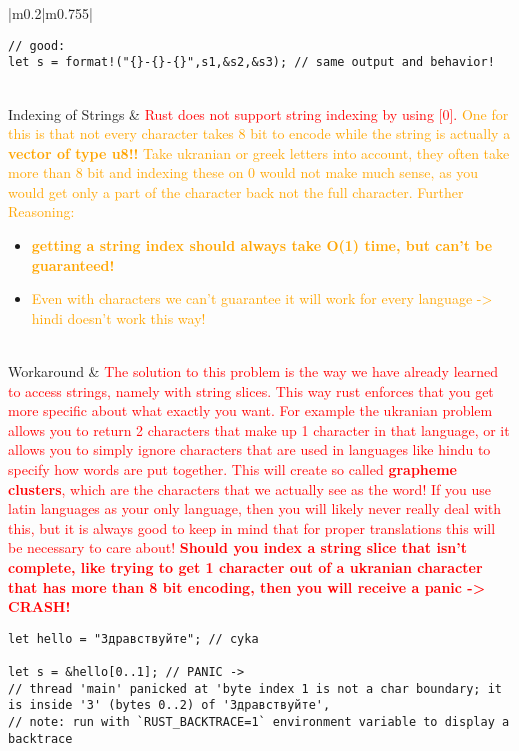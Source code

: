 \documentclass[main.tex,fontsize=8pt,paper=a4,paper=portrait,DIV=calc,]{scrartcl}
\begin{document}
\begin{table}[ht!]
\begin{tabular}{|m{0.2\linewidth}|m{0.755\linewidth}|}
\begin{lstlisting}
// good:
let s = format!("{}-{}-{}",s1,&s2,&s3); // same output and behavior!
\end{lstlisting}\\
\hline
Indexing of Strings & 
\textcolor{red}{Rust does not support string indexing by using [0].}\newline
\textcolor{orange}{One for this is that not every character takes 8 bit to encode while the string is actually a \textbf{vector of type u8!!} Take ukranian or greek letters into account, they often take more than 8 bit and indexing these on 0 would not make much sense, as you would get only a part of the character back not the full character.}\newline
\textcolor{orange}{Further Reasoning:}\newline
\begin{itemize}
\item \textcolor{orange}{\textbf{getting a string index should always take O(1) time, but can't be guaranteed!}}
\item \textcolor{orange}{Even with characters we can't guarantee it will work for every language -> hindi doesn't work this way!}
\end{itemize}\\ 
\hline
Workaround & 
\textcolor{red}{The solution to this problem is the way we have already learned to access strings, namely with string slices. This way rust enforces that you get more specific about what exactly you want. For example the ukranian problem allows you to return 2 characters that make up 1 character in that language, or it allows you to simply ignore characters that are used in languages like hindu to specify how words are put together. This will create so called \textbf{grapheme clusters}, which are the characters that we actually see as the word!\newline
If you use latin languages as your only language, then you will likely never really deal with this, but it is always good to keep in mind that for proper translations this will be necessary to care about!\newline
\textbf{Should you index a string slice that isn't complete, like trying to get 1 character out of a ukranian character that has more than 8 bit encoding, then you will receive a panic -> CRASH!}}\newline
\begin{lstlisting}
let hello = "Здравствуйте"; // cyka

let s = &hello[0..1]; // PANIC -> 
// thread 'main' panicked at 'byte index 1 is not a char boundary; it is inside 'З' (bytes 0..2) of 'Здравствуйте',
// note: run with `RUST_BACKTRACE=1` environment variable to display a backtrace
\end{lstlisting}\\
\hline
\end{tabular}
\end{table}
\end{document}
